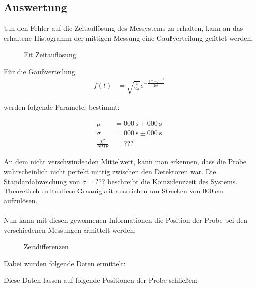 \documentclass[12pt,twoside,a4paper]{scrartcl}
\begin{document}
			\subsection{Auswertung}
				Um den Fehler auf die Zeitauflösung des Messystems zu erhalten, kann an das erhaltene Histogramm der mittigen Messung eine Gaußverteilung gefittet werden.

				\begin{figure}[H]
					\centering


					\caption{Fit Zeitauflösung}
				\end{figure}

				Für die Gaußverteilung
				\begin{align*}
					f(t) &= \sqrt{\frac{1}{2 \pi}} e^{-\frac{(x-\mu)^2}{2 \sigma^2}}
				\end{align*}

				werden folgende Parameter bestimmt:

				\begin{align*}
					\mu &= \SI{000}{\second} \pm \SI{000}{\second} \\
					\sigma &= \SI{000}{\second} \pm \SI{000}{\second} \\
					\frac{\chi^2}{NDF} &= ???
				\end{align*}

				An dem nicht verschwindenden Mittelwert, kann man erkennen, dass die Probe wahrscheinlich nicht perfekt mittig zwischen den Detektoren war.
				Die Standardabweichung von $\sigma = ???$ beschreibt die Koinzidenzzeit des Systems. Theoretisch sollte diese Genauigkeit ausreichen um Strecken von $\SI{000}{\centi \metre}$ aufzulösen.
				 \\
				 \\

				 Nun kann mit diesen gewonnenen Informationen die Position der Probe bei den verschiedenen Messungen ermittelt werden:

				 \begin{figure}
				 		\centering


						\caption{Zeitdifferenzen}
				 \end{figure}

				 Dabei wurden folgende Daten ermittelt:

				 

				 Diese Daten lassen auf folgende Positionen der Probe schließen:
\end{document}
